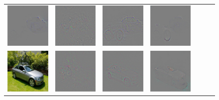 \begin{figure}
\begin{center}
\begin{tabular}{ccccccc}
\includegraphics[width=0.14\linewidth,height=0.115\linewidth]{figs/examples/googlenet/soft/bic-car1_diff_818} &
\includegraphics[width=0.14\linewidth,height=0.115\linewidth]{figs/examples/googlenet/oxford/bic-car1_diff_672} &
\includegraphics[width=0.14\linewidth,height=0.115\linewidth]{figs/examples/googlenet/deconv/bic-car1_diff_672} &
\includegraphics[width=0.14\linewidth,height=0.115\linewidth]{figs/examples/googlenet/soft/bic-car1_diff_672} \\
\vspace{-2.5pt}
\includegraphics[width=0.14\linewidth,height=0.115\linewidth]{figs/examples/googlenet/oxford/bic-car2} &
\includegraphics[width=0.14\linewidth,height=0.115\linewidth]{figs/examples/googlenet/oxford/bic-car2_diff_818} &
\includegraphics[width=0.14\linewidth,height=0.115\linewidth]{figs/examples/googlenet/deconv/bic-car2_diff_818} &
\includegraphics[width=0.14\linewidth,height=0.115\linewidth]{figs/examples/googlenet/soft/bic-car2_diff_818} &

\end{tabular}
\end{center}
\end{figure}
